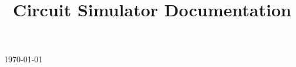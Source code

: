 \documentclass[12pt]{amsart}
\title{Circuit Simulator Documentation}
\begin{document}
\today
\maketitle
\end{document}
